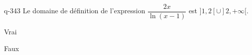\begin{truefalse}{q-343}
Le domaine de définition de l'expression $\dfrac{2x}{\ln(x-1)}$ est $]1,2[\cup]2,+\infty[$.
\item* Vrai
\item Faux
\end{truefalse}

